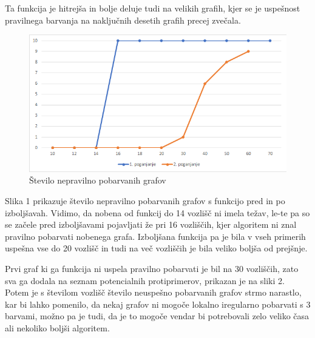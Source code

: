 \documentclass[12pt, a4paper]{article}
\begin{document}
Ta funkcija je hitrejša in bolje deluje tudi na velikih grafih, kjer se je uspešnost pravilnega barvanja na naključnih desetih grafih precej zvečala.

\begin{figure}[H]
  \includegraphics[width=\linewidth]{stevilo_nepravilnih.png}
  \caption{Število nepravilno pobarvanih grafov}
  \label{fig:število nepravilno pobarvanih grafov}
\end{figure}

Slika 1 prikazuje število nepravilno pobarvanih grafov s funkcijo pred in po izboljšavah. Vidimo, da nobena od funkcij do 14 vozlišč ni imela težav, le-te pa so se začele pred izboljšavami pojavljati že pri 16 vozliščih, kjer algoritem ni znal pravilno pobarvati nobenega grafa. Izboljšana funkcija pa je bila v vseh primerih uspešna vse do 20 vozlišč in tudi na več vozliščih je bila veliko boljša od prejšnje.

Prvi graf ki ga funkcija ni uspela pravilno pobarvati je bil na 30 vozliščih, zato sva ga dodala na seznam potencialnih protiprimerov, prikazan je na sliki 2. Potem je s številom vozlišč  število neuspešno pobarvanih grafov strmo narastlo, kar bi lahko pomenilo, da nekaj grafov ni mogoče lokalno iregularno pobarvati s 3 barvami, možno pa je tudi, da je to mogoče vendar bi potrebovali zelo veliko časa ali nekoliko boljši algoritem.
\end{document}
